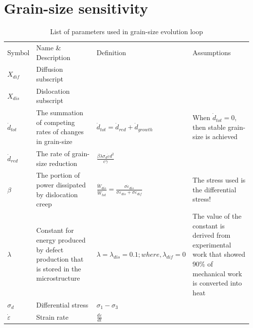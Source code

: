 \documentclass[]{scrreprt}
\begin{document}
\chapter{Grain-size sensitivity}
\label{chapter:size_sensitivity}

\begin{table}
  \caption[inline]{List of parameters used in grain-size evolution loop}
\label{tab:grain_evo_params}

\begin{tabular}{| L{1.3cm} | C{3.95cm} | C{5.25cm} | C{4.95cm} |}
\hline\noalign{\smallskip}
Symbol & Name \& Description & Definition & Assumptions \\
\noalign{\smallskip}\hline\noalign{\smallskip}

$X_{dif}$ & {\small Diffusion subscript} &  &  \\

$X_{dis}$ & {\small Dislocation subscript} &  &  \\

$\dot{d}_{tot}$ & {\small The summation of competing rates of changes in grain-size} & $\dot{d}_{tot} = \dot{d}_{red} + \dot{d}_{growth}$ & {\small When $\dot{d}_{tot} = 0$, then stable grain-size is achieved} \\

$\dot{d}_{red}$ & {\small The rate of grain-size reduction} & $\frac{\beta\lambda\sigma_{d}\dot{\varepsilon}d^2}{c\gamma}$ &  \\

$\beta$ & {\small The portion of power dissipated by dislocation creep} & $\frac{\dot{W}_{dis}}{\dot{W}_{tot}} = \frac{\sigma\dot{\varepsilon}_{dis}}{\sigma\dot{\varepsilon}_{dis} + \sigma\dot{\varepsilon}_{dif}}$ & {\small The stress used is the differential stress!} \\

$\lambda$ & {\small Constant for energy produced by defect production that is stored in the microstructure} & $\lambda=\lambda_{dis}= 0.1;  where,   \lambda_{dif} = 0$ & {\small The value of the constant is derived from experimental work that showed 90\% of mechanical work is converted into heat \citep{Austin2009}}\\

$\sigma_{d}$ & {\small Differential stress} & $\sigma_{1} - \sigma_{3}$ &  \\

$\dot{\varepsilon}$ & {\small Strain rate} & $\frac{d\varepsilon}{dt}$ &  \\


\end{tabular}
\end{table}
\end{document}
